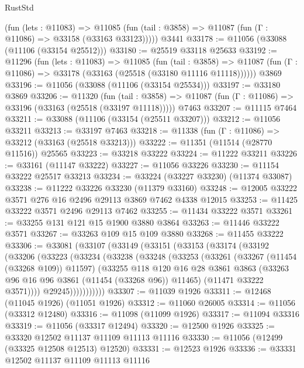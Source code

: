 \begin{lexlean}{RustStd}
\begin{coremodule}
      (fun (lets : @11083) =>
      @11085 (fun (tail : @3858) => @11087 (fun (Γ : @11086) => @33158 (@33163 @33123)))))
    @3441
@33178 := @11056 (@33088 (@11106 (@33154 @25512)))
@33180 := @25519 @33118 @25633
@33192 := @11296
    (fun (lets : @11083) =>
    @11085
      (fun (tail : @3858) =>
      @11087 (fun (Γ : @11086) => @33178 (@33163 (@25518 (@33180 @11116 @11118))))))
    @3869
@33196 := @11056 (@33088 (@11106 (@33154 @25534)))
@33197 := @33180 @3869
@33206 := @11320
    (fun (tail : @3858) => @11087 (fun (Γ : @11086) => @33196 (@33163 (@25518 (@33197 @11118)))))
    @7463
@33207 := @11115 @7464
@33211 := @33088 (@11106 (@33154 (@25511 @33207)))
@33212 := @11056 @33211
@33213 := @33197 @7463
@33218 := @11338 (fun (Γ : @11086) => @33212 (@33163 (@25518 @33213)))
@33222 := @11351 (@11514 (@28770 @11516)) @25565
@33223 := @33218 @33222
@33224 := @11222 @33211
@33226 := @33161 (@11147 @33222)
@33227 := @11056 @33226
@33230 := @11154 @33222 @25517 @33213
@33234 := @33224 (@33227 @33230) (@11374 @33087)
@33238 := @11222 @33226 @33230 (@11379 @33160)
@33248 := @12005 @33222 @3571 @276 @16 @2496 @29113 @3869 @7462 @4338 @12015
@33253 := @11425 @33222 @3571 @2496 @29113 @7462
@33255 := @11434 @33222 @3571
@33261 := @33255 @131 @121 @15 @1900 @3880 @3864
@33263 := @11446 @33222 @3571
@33267 := @33263 @109 @15 @109 @3880
@33268 := @11455 @33222
@33306 := @33081
    (@33107
      (@33149
        (@33151
          (@33153
            (@33174
              (@33192
                (@33206
                  (@33223
                    (@33234
                      (@33238
                        (@33248
                          (@33253
                            (@33261
                              (@33267 (@11454 (@33268 @109)) @11597)
                              (@33255
                                @118
                                @120
                                @16
                                @28
                                @3861
                                @3863
                                (@33263 @96 @16 @96 @3861 (@11454 (@33268 @96)) @11465)
                                (@11471 @33222 @3571))))
                          @29245)))))))))))
@33307 := @11039 @1926
@33311 := @12468 (@11045 @1926) (@11051 @1926)
@33312 := @11060 @26005
@33314 := @11056 (@33312 @12480)
@33316 := @11098 (@11099 @1926)
@33317 := @11094 @33316
@33319 := @11056 (@33317 @12494)
@33320 := @12500 @1926
@33325 := @33320 @12502 @11137 @11109 @11113 @11116
@33330 := @11056 (@12499 (@33325 @12508 @12513) @12520)
@33331 := @12523 @1926
@33336 := @33331 @12502 @11137 @11109 @11113 @11116

\end{coremodule}
\end{lexlean}

